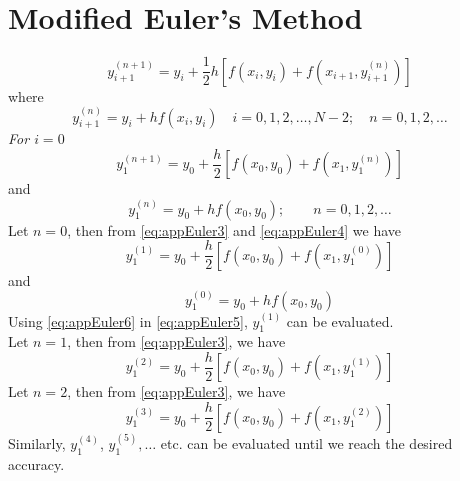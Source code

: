 \documentclass[../main-sheet.tex]{subfiles}
\begin{document}
\section{Modified Euler's Method}
\begin{equation}
    y_{i+1}^{(n+1)}=y_i+\frac{1}{2}h\left[ f(x_i,y_i)+f(x_{i+1},y_{i+1}^{(n)}) \right]
    \label{eq:appEuler1}
\end{equation}
where
\begin{equation}
    y_{i+1}^{(n)}=y_i+hf(x_i,y_i) \quad i=0,1,2,\dots,N-2;\quad n=0,1,2,\dots \label{eq:appEuler2}
\end{equation}
\emph{For \(i=0\)}
\begin{equation}
    y_1^{(n+1)}=y_0+\frac{h}{2}\left[ f(x_0,y_0)+f(x_{1},y_{1}^{(n)}) \right]
    \label{eq:appEuler3}
\end{equation}
and 
\begin{equation}
    y_{1}^{(n)}=y_0+hf(x_0,y_0);\qquad n=0,1,2,\dots \label{eq:appEuler4}
\end{equation}
Let \(n=0\), then from \eqref{eq:appEuler3} and \eqref{eq:appEuler4} we have
\begin{equation}
    y_1^{(1)}=y_0+\frac{h}{2}\left[ f(x_0,y_0)+f(x_{1},y_{1}^{(0)}) \right]
    \label{eq:appEuler5}
\end{equation}
and 
\begin{equation}
    y_{1}^{(0)}=y_0+hf(x_0,y_0) \label{eq:appEuler6}
\end{equation}
Using \eqref{eq:appEuler6} in \eqref{eq:appEuler5}, \(y_1^{(1)}\) can be evaluated.\\
Let \(n=1\), then from \eqref{eq:appEuler3}, we have
\begin{equation}
    y_1^{(2)}=y_0+\frac{h}{2}\left[ f(x_0,y_0)+f(x_{1},y_{1}^{(1)}) \right]
    \label{eq:appEuler7}
\end{equation}
Let \(n=2\), then from \eqref{eq:appEuler3}, we have
\begin{equation}
    y_1^{(3)}=y_0+\frac{h}{2}\left[ f(x_0,y_0)+f(x_{1},y_{1}^{(2)}) \right]
    \label{eq:appEuler8}
\end{equation}
Similarly, \(y_1^{(4)}\), \(y_1^{(5)}, \dots\) etc. can be evaluated until we reach the desired accuracy.
\end{document}
